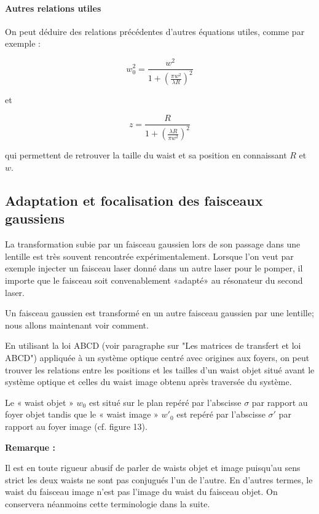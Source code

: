 \documentclass{book}
\begin{document}
\paragraph{Autres relations utiles}

On peut déduire des relations précédentes d'autres équations utiles, comme par exemple :

$$w_0^2 = \frac {w^2}{1+\left(\frac{\pi w^2}{\lambda R}\right)^2}$$

et

$$z = \frac {R}{1+\left(\frac{\lambda R}{\pi w^2}\right)^2}$$

qui permettent de retrouver la taille du waist et sa position en connaissant $R$ et $w$. 

\subsection{Adaptation et focalisation des faisceaux gaussiens}

 La transformation subie par un faisceau gaussien lors de son passage dans une lentille est très souvent rencontrée expérimentalement. Lorsque l'on veut par exemple injecter un faisceau laser donné dans un autre laser pour le pomper, il importe que le faisceau soit convenablement «adapté» au résonateur du second laser.

Un faisceau gaussien est transformé en un autre faisceau gaussien par une lentille; nous allons maintenant voir comment.

En utilisant la loi ABCD (voir paragraphe sur "Les matrices de transfert et loi ABCD") appliquée à un système optique centré avec origines aux foyers, on peut trouver les relations entre les positions et les tailles d'un waist objet situé avant le système optique et celles du waist image obtenu après traversée du système.

Le « waist objet » $w_0$ est situé sur le plan repéré par l'abscisse $\sigma$ par rapport au foyer objet tandis que le « waist image » $w'_0$ est repéré par l'abscisse $\sigma '$ par rapport au foyer image (cf. figure 13).

\textbf{\color{remarque1}Remarque :}  
\begin{mdframed}[linecolor=remarque1, backgroundcolor=remarque2]

Il est en toute rigueur abusif de parler de waists objet et image puisqu'au sens strict les deux waists ne sont pas conjugués l'un de l'autre. En d'autres termes, le waist du faisceau image n'est pas l'image du waist du faisceau objet. On conservera néanmoins cette terminologie dans la suite.

\end{mdframed}
\end{document}
